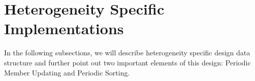 



    
    


\section{Heterogeneity Specific Implementations}\label{sec:heterogeneitySpecificImplementations}
 In the following subsections, we will describe heterogeneity specific design data structure and further point out two important elements of this design: Periodic Member Updating and Periodic Sorting.

